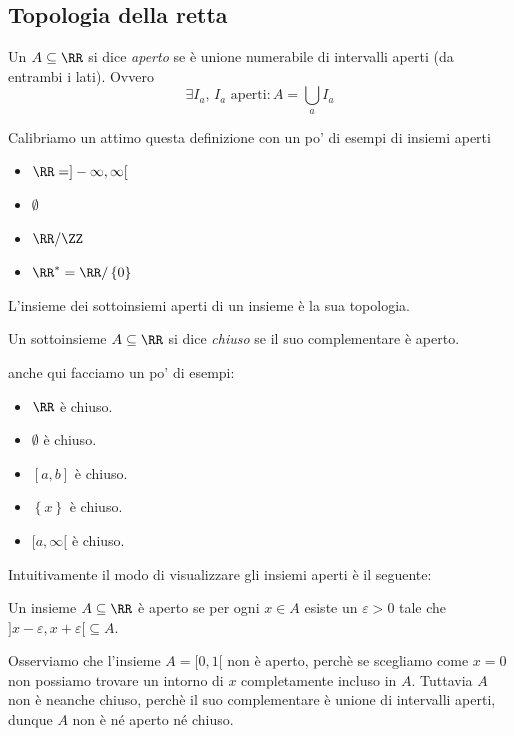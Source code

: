 \documentclass[11pt]{scrartcl}
\begin{document}
	\subsection{Topologia della retta}
	
	\begin{definition}
		Un $A\subseteq \RR$ si dice \textit{aperto} se è unione numerabile di intervalli aperti (da entrambi i lati). Ovvero
		$$\exists I_a,\,I_a \text{ aperti}: A=\bigcup_a I_a$$
	\end{definition}
	Calibriamo un attimo questa definizione con un po' di esempi di insiemi aperti
	\begin{itemize}
		\item $\RR = ]-\infty,\infty[$
		\item $\emptyset$ 
		\item $\RR/\ZZ$
		\item $\RR^*=\RR/\left\{0\right\}$
	\end{itemize}
	
	\begin{definition}[Topologia]
		L'insieme dei sottoinsiemi aperti di un insieme è la sua topologia.
	\end{definition}
	
	\begin{definition}
		Un sottoinsieme $A\subseteq\RR$ si dice \textit{chiuso} se il suo complementare è aperto.
	\end{definition}
	
	anche qui facciamo un po' di esempi:
	\begin{itemize}
		\item $\RR$ è chiuso.
		\item $\emptyset$ è chiuso.
		\item $[a,b]$ è chiuso.
		\item $\left\{x\right\}$ è chiuso.
		\item $[a,\infty[$ è chiuso.
	\end{itemize}
	Intuitivamente il modo di visualizzare gli insiemi aperti è il seguente:
	\begin{proposition}
		Un insieme $A\subseteq\RR$ è aperto se per ogni $x\in A$ esiste un $\varepsilon>0$ tale che $]x-\varepsilon,x+\varepsilon[\subseteq A$.
	\end{proposition}
	Osserviamo che l'insieme $A=[0,1[$ non è aperto, perchè se scegliamo come $x=0$ non possiamo trovare un intorno di $x$ completamente incluso in $A$. Tuttavia $A$ non è neanche chiuso, perchè il suo complementare è unione di intervalli aperti, dunque $A$ non è né aperto né chiuso.
	
\end{document}
